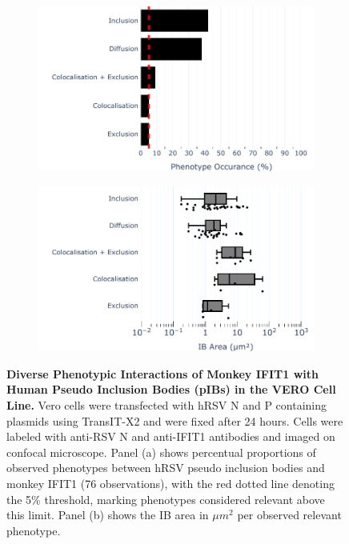 \begin{figure}
    \begin{subfigure}{0.495\textwidth}
        \caption{}
        \includegraphics[width=1\linewidth]{08. Chapter 3/Figs/03. pIB/02. IFIT1/04. bar_i1_vero_hnhp.pdf} 
    \end{subfigure}
    \begin{subfigure}{0.495\textwidth}
        \caption{}
        \includegraphics[width=1\linewidth]{08. Chapter 3/Figs/03. pIB/02. IFIT1/05. box_i1_vero_hnhp.pdf}
    \end{subfigure}
    \caption[Diverse Phenotypic Interactions of Monkey IFIT1 with Human Pseudo Inclusion Bodies (pIBs) in the VERO Cell Line.]{\textbf{Diverse Phenotypic Interactions of Monkey IFIT1 with Human Pseudo Inclusion Bodies (pIBs) in the VERO Cell Line.} Vero cells were transfected with hRSV N and P containing plasmids using TransIT-X2 and were fixed after 24 hours. Cells were labeled with anti-RSV N and anti-IFIT1 antibodies and imaged on confocal microscope. Panel (a) shows percentual proportions of observed phenotypes between hRSV pseudo inclusion bodies and monkey IFIT1 (76 observations), with the red dotted line denoting the 5\% threshold, marking phenotypes considered relevant above this limit. Panel (b) shows the IB area in \(\mu m^2\) per observed relevant phenotype.}
    \label{fig:Diverse Phenotypic Interactions of Monkey IFIT1 with Human Pseudo Inclusion Bodies (pIBs) in the VERO Cell Line}
\end{figure}

